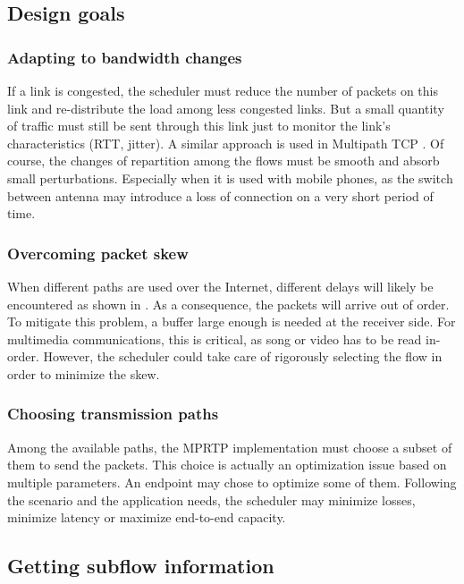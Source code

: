 \subsection{Design goals}

\subsubsection{Adapting to bandwidth changes}

If a link is congested, the scheduler must reduce the number of packets on this link and re-distribute the load among less congested links. But a small quantity of traffic must still be sent through this link just to monitor the link's characteristics (RTT, jitter). A similar approach is used in Multipath TCP \cite{wischik2011design}. Of course, the changes of repartition among the flows must be smooth and absorb small perturbations. Especially when it is used with mobile phones, as the switch between antenna may introduce a loss of connection on a very short period of time.

\subsubsection{Overcoming packet skew}

When different paths are used over the Internet, different delays will likely be encountered as shown in \cite{PCVB13}. As a consequence, the packets will arrive out of order. To mitigate this problem, a buffer large enough is needed at the receiver side. For multimedia communications, this is critical, as song or video has to be read in-order. However, the scheduler could take care of rigorously selecting the flow in order to minimize the skew.

\subsubsection{Choosing transmission paths}

Among the available paths, the MPRTP implementation must choose a subset of them to send the packets. This choice is actually an optimization issue based on multiple parameters. An endpoint may chose to optimize some of them. Following the scenario and the application needs, the scheduler may minimize losses, minimize latency or maximize end-to-end capacity.

\subsection{Getting subflow information}

